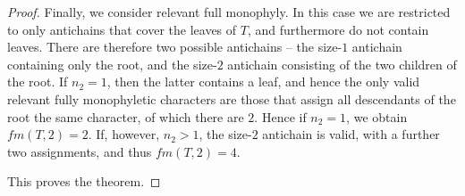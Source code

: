 \documentclass[10pt,a4paper]{amsart}
\begin{document}
\begin{proof}
Finally, we consider relevant full monophyly. In this case we are restricted to only antichains that cover the leaves of $T$, and furthermore do not contain leaves. There are therefore two possible antichains -- the size-$1$ antichain containing only the root, and the size-$2$ antichain consisting of the two children of the root. If $n_2=1$, then the latter contains a leaf, and hence the only valid relevant fully monophyletic characters are those that assign all descendants of the root the same character, of which there are $2$. Hence if $n_2=1$, we obtain $fm(T,2)=2$. If, however, $n_2>1$, the size-$2$ antichain is valid, with a further two assignments, and thus $fm(T,2)=4$.

This proves the theorem.
\end{proof}
\end{document}
